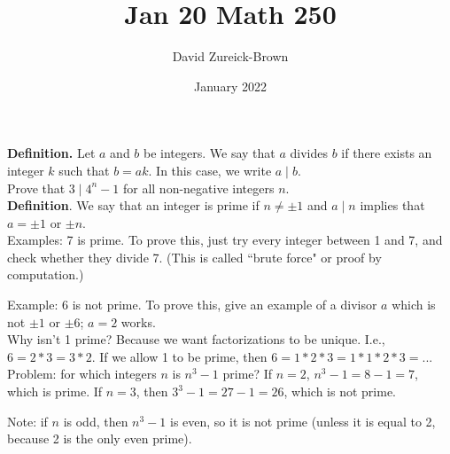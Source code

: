 \documentclass{article}
\title{Jan 20 Math 250}
\author{David Zureick-Brown}
\date{January 2022}
\begin{document}
\maketitle

\textbf{Definition.} Let $a$ and $b$ be integers. We say that $a$ divides $b$ if there exists an integer $k$ such that $b =ak$. In this case, we write $a \mid b$. 
\\

Prove that $3 \mid 4^n -1$ for all non-negative integers $n$.
\\

\textbf{Definition}. We say that an integer is prime if $n \not = \pm 1$ and $a \mid n$ implies that $a = \pm 1$ or $\pm n$.
\\

Examples: 7 is prime. To prove this, just try every integer between 1 and 7, and check whether they divide 7. (This is called ``brute force" or proof by computation.)

Example: 6 is not prime. To prove this, give an example of a divisor $a$ which is not $\pm 1$ or $\pm 6$; $a = 2$ works.
\\

Why isn't 1 prime? Because we want factorizations to be unique. I.e., $6 = 2*3 = 3*2$. If we allow 1 to be prime, then $6 = 1*2*3 = 1*1*2*3 = ...$
\\

Problem: for which integers $n$ is $n^3 -1$ prime? If $n = 2$, $n^3 - 1 = 8-1 = 7$, which is prime. If $n = 3$, then $3^3 - 1 = 27-1=26$, which is not prime.

Note: if $n$ is odd, then $n^3 - 1$ is even, so it is not prime (unless it is equal to 2, because 2 is the only even prime). 
\end{document}
